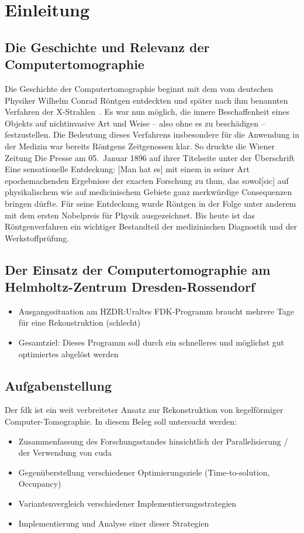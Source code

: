 \chapter{Einleitung}

\section{Die Geschichte und Relevanz der Computertomographie}

Die Geschichte der Computertomographie beginnt mit dem vom deutschen Physiker Wilhelm Conrad Röntgen entdeckten
und später nach ihm benannten Verfahren der {\glqq}X-Strahlen{\grqq}~\cite{roentgen}. Es war nun möglich, die innere
Beschaffenheit eines Objekts auf nichtinvasive Art und Weise -- also ohne es zu beschädigen -- festzustellen. Die
Bedeutung dieses Verfahrens insbesondere für die Anwendung in der Medizin war bereits Röntgens Zeitgenossen klar.
So druckte die Wiener Zeitung {\glqq}Die Presse{\grqq} am 05.\ Januar 1896 auf ihrer Titelseite unter der Überschrift
{\glqq}Eine sensationelle Entdeckung{\grqq}: {\glqq}[Man hat es] mit einem in seiner Art epochemachenden Ergebnisse der
exacten Forschung zu thun, das sowol[sic] auf physikalischem wie auf medicinischem Gebiete ganz merkwürdige Consequenzen
bringen dürfte.{\grqq} Für seine Entdeckung wurde Röntgen in der Folge unter anderem mit dem ersten Nobelpreis für
Physik ausgezeichnet. Bis heute ist das Röntgenverfahren ein wichtiger Bestandteil der medizinischen Diagnostik und der
Werkstoffprüfung.

\section{Der Einsatz der Computertomographie am Helmholtz-Zentrum Dresden-Rossendorf}

\begin{itemize}
    \item Ausgangssituation am HZDR:\@ Uraltes FDK-Programm braucht mehrere Tage für eine Rekonstruktion (schlecht)
    \item Gesamtziel: Dieses Programm soll durch ein schnelleres und möglichst gut optimiertes abgelöst werden
\end{itemize}

\section{Aufgabenstellung}

Der \gls{fdk} ist ein weit verbreiteter Ansatz zur Rekonstruktion von kegelförmiger Computer-Tomographie. In diesem
Beleg soll untersucht werden:

\begin{itemize}
    \item Zusammenfassung des Forschungsstandes hinsichtlich der Parallelisierung / der Verwendung von \gls{cuda}
    \item Gegenüberstellung verschiedener Optimierungsziele (Time-to-solution, Occupancy)
    \item Variantenvergleich verschiedener Implementierungsstrategien
    \item Implementierung und Analyse einer dieser Strategien
\end{itemize}
